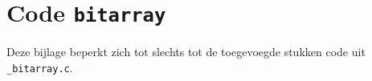 \chapter{Code \texttt{bitarray}}
\label{app:bitarray}

Deze bijlage beperkt zich tot slechts tot de toegevoegde stukken code uit \texttt{\_bitarray.c}.\\




